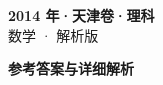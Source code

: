 \documentclass[zihao=-4, a4paper]{ctexart}
\begin{document}
\begin{center}
  {\Large\bfseries 2014 年·天津卷·理科}\\[4pt]
  {\large 数学 · 解析版}
\end{center}
\medskip
{}

\clearpage
{}
\begin{center}{\Large\bfseries 参考答案与详细解析}\end{center}
\medskip

\end{document}
